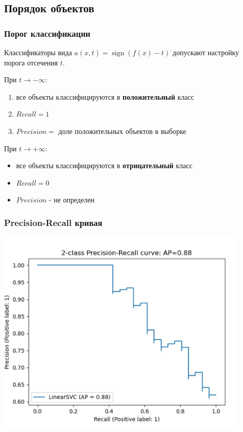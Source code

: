 \documentclass{beamer}
\DeclareMathOperator{\sign}{sign}
\begin{document}
	\subsection{Порядок объектов}
	
	\begin{frame}
		\frametitle{Порог классификации}
		Классификаторы вида $a(x, t) = \sign \left(f(x) - t\right)$ допускают настройку порога отсечения $t$.
		
		\vspace{15pt}
		
		При $t \rightarrow -\infty$:
		\begin{enumerate}
			\item все объекты классифицируются в \textbf{положительный} класс
			\item $Recall = 1$
			\item $Precision = $ доле положительных объектов в выборке
		\end{enumerate}
		
		\vspace{5pt}
		
		При $t \rightarrow +\infty$:
		\begin{itemize}
			\item  все объекты классифицируются в \textbf{отрицательный} класс
			\item $Recall = 0$
			\item $Precision$ - не определен
		\end{itemize}
	\end{frame}
	
	\begin{frame}
		\frametitle{Precision-Recall кривая}
		
		\includegraphics[width=0.9\textwidth]{img/pr_rc.png}
	\end{frame}
	
\end{document}
